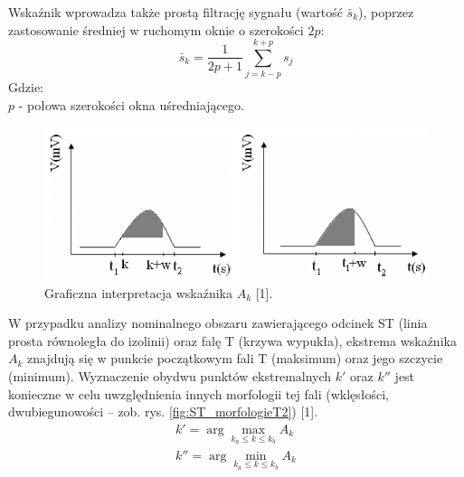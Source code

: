 Wskaźnik wprowadza także prostą filtrację sygnału (wartość $ \bar{s}_k $), poprzez zastosowanie średniej w ruchomym oknie o szerokości $ 2p $:
\begin{equation}
	\bar{s}_k = \frac{1}{2p+1} \sum_{j=k-p}^{k+p} s_j
\end{equation}
Gdzie:\\
$ p $ - połowa szerokości okna uśredniającego.
\begin{figure}[H]
	\centering
	\includegraphics[width=1\textwidth]{ST_INTERVAL/img/ST_wskaznikAK.png}
	\caption{Graficzna interpretacja wskaźnika $ A_k $ [1].}
	\label{fig:ST_wskaznikAK}
\end{figure}
W przypadku analizy nominalnego obszaru zawierającego odcinek ST (linia prosta równoległa do izolinii) oraz falę T (krzywa wypukła), ekstrema wskaźnika $ A_k $ znajdują się w punkcie początkowym fali T (maksimum) oraz jego szczycie (minimum). Wyznaczenie obydwu punktów ekstremalnych $ k' $ oraz $ k'' $ jest konieczne w celu uwzględnienia innych morfologii tej fali (wklęsłości, dwubiegunowości – zob. rys. \ref{fig:ST_morfologieT2}) [1].
\begin{subequations}
	\begin{align}
	k' = \arg \max_{k_a \leq k \leq k_b} A_k \\
	k'' = \arg \min_{k_a \leq k \leq k_b} A_k
	\end{align}
\end{subequations}

